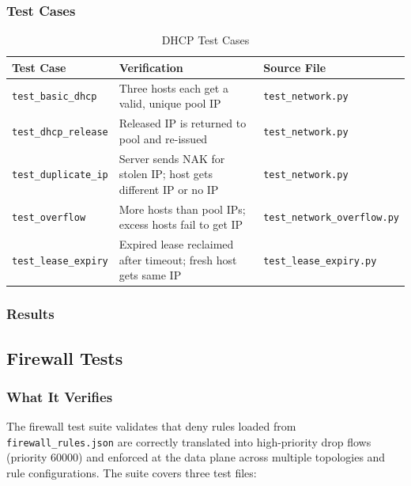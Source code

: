 \documentclass[12pt,a4paper]{article}
\begin{document}
\subsubsection{Test Cases}

\begin{table}[H]
\centering
\begin{tabular}{@{}p{5cm}p{4.5cm}p{4cm}@{}}
\toprule
\textbf{Test Case} & \textbf{Verification} & \textbf{Source File} \\
\midrule
\texttt{test\_basic\_dhcp} & Three hosts each get a valid, unique pool IP & \texttt{test\_network.py} \\
\texttt{test\_dhcp\_release} & Released IP is returned to pool and re-issued & \texttt{test\_network.py} \\
\texttt{test\_duplicate\_ip} & Server sends NAK for stolen IP; host gets different IP or no IP & \texttt{test\_network.py} \\
\texttt{test\_overflow} & More hosts than pool IPs; excess hosts fail to get IP & \texttt{test\_network\_overflow.py} \\
\texttt{test\_lease\_expiry} & Expired lease reclaimed after timeout; fresh host gets same IP & \texttt{test\_lease\_expiry.py} \\
\bottomrule
\end{tabular}
\caption{DHCP Test Cases}
\end{table}

\subsubsection{Results}

\begin{center}
\end{center}

\subsection{Firewall Tests}

\subsubsection{What It Verifies}

The firewall test suite validates that deny rules loaded from \texttt{firewall\_rules.json} are correctly translated into high-priority drop flows (priority 60000) and enforced at the data plane across multiple topologies and rule configurations. The suite covers three test files:
\end{document}
